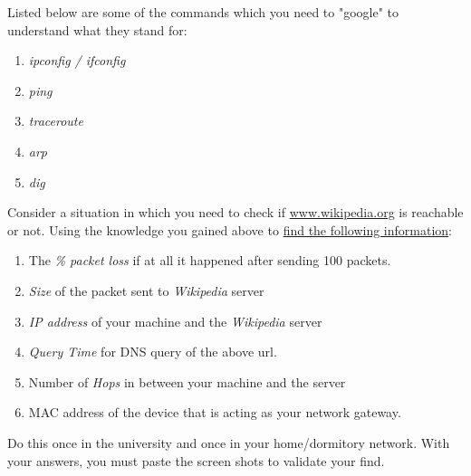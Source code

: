 \documentclass{WeSTassignment}
\begin{document}
Listed below are some of the commands which you need to "google" to understand what they stand for:
\begin{enumerate}
\item \emph{ipconfig / ifconfig}
\item \emph{ping}
\item \emph{traceroute}
\item \emph{arp}
\item \emph{dig}
\end{enumerate}

Consider a situation in which you need to check if \url{www.wikipedia.org} is reachable or not. Using the knowledge you gained above to \underline{find the following information}:
\begin{enumerate}
\itemsep0em
\item The \emph{\% packet loss} if at all it happened after sending 100 packets. 
\item \emph{Size} of the packet sent to \emph{Wikipedia} server
\item \emph{IP address} of your machine and the \emph{Wikipedia} server
\item \emph{Query Time} for DNS query of the above url.
\item Number of \emph{Hops} in between your machine and the server
\item MAC address of the device that is acting as your network gateway. 
\end{enumerate}

Do this once in the university and once in your home/dormitory network. With your answers, you must paste the screen shots to validate your find.
\end{document}
